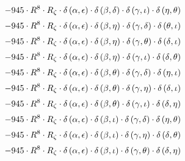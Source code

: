 \begin{subequations}
\begin{gather}
 \\[0.2em] \notag 		 - 945 \cdot R^{8} \cdot R_{\zeta{}} \cdot \delta{}\left(\alpha{}, \epsilon{}\right) \cdot \delta{}\left(\beta{}, \delta{}\right) \cdot \delta{}\left(\gamma{}, \iota{}\right) \cdot \delta{}\left(\eta{}, \theta{}\right) 
 \\[0.2em] \notag 		 - 945 \cdot R^{8} \cdot R_{\zeta{}} \cdot \delta{}\left(\alpha{}, \epsilon{}\right) \cdot \delta{}\left(\beta{}, \eta{}\right) \cdot \delta{}\left(\gamma{}, \delta{}\right) \cdot \delta{}\left(\theta{}, \iota{}\right) 
 \\[0.2em] \notag 		 - 945 \cdot R^{8} \cdot R_{\zeta{}} \cdot \delta{}\left(\alpha{}, \epsilon{}\right) \cdot \delta{}\left(\beta{}, \eta{}\right) \cdot \delta{}\left(\gamma{}, \theta{}\right) \cdot \delta{}\left(\delta{}, \iota{}\right) 
 \\[0.2em] \notag 		 - 945 \cdot R^{8} \cdot R_{\zeta{}} \cdot \delta{}\left(\alpha{}, \epsilon{}\right) \cdot \delta{}\left(\beta{}, \eta{}\right) \cdot \delta{}\left(\gamma{}, \iota{}\right) \cdot \delta{}\left(\delta{}, \theta{}\right) 
 \\[0.2em] \notag 		 - 945 \cdot R^{8} \cdot R_{\zeta{}} \cdot \delta{}\left(\alpha{}, \epsilon{}\right) \cdot \delta{}\left(\beta{}, \theta{}\right) \cdot \delta{}\left(\gamma{}, \delta{}\right) \cdot \delta{}\left(\eta{}, \iota{}\right) 
 \\[0.2em] \notag 		 - 945 \cdot R^{8} \cdot R_{\zeta{}} \cdot \delta{}\left(\alpha{}, \epsilon{}\right) \cdot \delta{}\left(\beta{}, \theta{}\right) \cdot \delta{}\left(\gamma{}, \eta{}\right) \cdot \delta{}\left(\delta{}, \iota{}\right) 
 \\[0.2em] \notag 		 - 945 \cdot R^{8} \cdot R_{\zeta{}} \cdot \delta{}\left(\alpha{}, \epsilon{}\right) \cdot \delta{}\left(\beta{}, \theta{}\right) \cdot \delta{}\left(\gamma{}, \iota{}\right) \cdot \delta{}\left(\delta{}, \eta{}\right) 
 \\[0.2em] \notag 		 - 945 \cdot R^{8} \cdot R_{\zeta{}} \cdot \delta{}\left(\alpha{}, \epsilon{}\right) \cdot \delta{}\left(\beta{}, \iota{}\right) \cdot \delta{}\left(\gamma{}, \delta{}\right) \cdot \delta{}\left(\eta{}, \theta{}\right) 
 \\[0.2em] \notag 		 - 945 \cdot R^{8} \cdot R_{\zeta{}} \cdot \delta{}\left(\alpha{}, \epsilon{}\right) \cdot \delta{}\left(\beta{}, \iota{}\right) \cdot \delta{}\left(\gamma{}, \eta{}\right) \cdot \delta{}\left(\delta{}, \theta{}\right) 
 \\[0.2em] \notag 		 - 945 \cdot R^{8} \cdot R_{\zeta{}} \cdot \delta{}\left(\alpha{}, \epsilon{}\right) \cdot \delta{}\left(\beta{}, \iota{}\right) \cdot \delta{}\left(\gamma{}, \theta{}\right) \cdot \delta{}\left(\delta{}, \eta{}\right) 

\end{gather}
\end{subequations}
